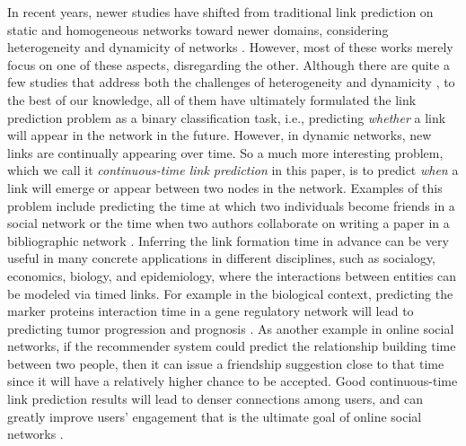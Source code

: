In recent years, newer studies have shifted from traditional link prediction on static and homogeneous networks toward newer domains, considering heterogeneity and dynamicity of networks \cite{dong2012link, davis2011multi, 7752228, hajibagheri2016leveraging, moradabadi2017novel}. However, most of these works merely focus on one of these aspects, disregarding the other. Although there are quite a few studies that address both the challenges of heterogeneity and dynamicity \cite{aggarwal2012dynamic, sett2017temporal}, to the best of our knowledge, all of them have ultimately formulated the link prediction problem as a binary classification task, i.e., predicting \emph{whether} a link will appear in the network in the future. However, in dynamic networks, new links are continually appearing over time. So a much more interesting problem, which we call it \emph{continuous-time link prediction} in this paper, is to predict \emph{when} a link will emerge or appear between two nodes in the network. Examples of this problem include predicting the time at which two individuals become friends in a social network or the time when two authors collaborate on writing a paper in a bibliographic network \cite{sun2012will}. Inferring the link formation time in advance can be very useful in many concrete applications {in different disciplines, such as socialogy, economics, biology, and epidemiology, where the interactions between entities can be modeled via timed links}. For example in the biological context, predicting the marker proteins interaction time in a gene regulatory network will lead to predicting tumor progression and prognosis \cite{taylor2009dynamic}. As another example in online social networks, if the recommender system could predict the relationship building time between two people, then it can issue a friendship suggestion close to that time since it will have a relatively higher chance to be accepted. Good continuous-time link prediction results will lead to denser connections among users, and can greatly improve users' engagement that is the ultimate goal of online social networks \cite{kwak2010twitter}.

